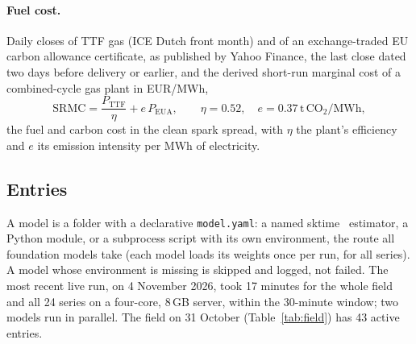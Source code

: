 \documentclass[11pt,a4paper]{article}
\newcommand{\m}[1]{\texttt{#1}}
\begin{document}
\paragraph{Fuel cost.} Daily closes of TTF gas (ICE Dutch front month) and of an exchange-traded EU carbon allowance
certificate, as published by Yahoo Finance, the last close dated two days before delivery or earlier, and the derived
short-run marginal cost of a combined-cycle gas plant in EUR/MWh,
\begin{equation}
\mathrm{SRMC} = \frac{P_{\mathrm{TTF}}}{\eta} + e\,P_{\mathrm{EUA}}, \qquad \eta = 0.52,\quad e = 0.37\,\mathrm{t\,CO_2/MWh},
\end{equation}
the fuel and carbon cost in the clean spark spread, with $\eta$ the plant's efficiency and $e$ its emission intensity
per MWh of electricity.

\subsection{Entries}

A model is a folder with a declarative \m{model.yaml}: a named sktime~\cite{sktime} estimator, a Python module, or a
subprocess script with its own environment, the route all foundation models take (each model loads its weights once
per run, for all series). A model whose environment is missing is skipped and logged, not failed. The most recent live
run, on 4 November 2026, took 17 minutes for the whole field and all 24 series on a four-core, 8\,GB server, within the
30-minute window; two models run in parallel. The field on 31 October (Table~\ref{tab:field}) has 43 active entries.
\end{document}
